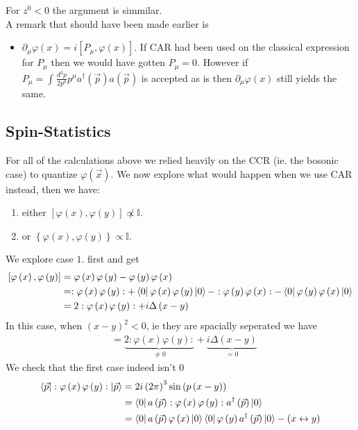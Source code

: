 \documentclass{report}
\begin{document}
For $z^{0} <0$ the argument is simmilar.\\
A remark that should have been made earlier is
\begin{itemize}
  \item $\partial_\mu \varphi\left( x \right) = i \left[ P_\mu, \varphi\left( x \right)  \right]  $. If CAR had been used on the classical expression for  $P_\mu$ then we would have gotten $P_\mu = 0$. However if $P_\mu = \int_{}^{} \frac{d^3p}{2p^{0} } p^{\mu} a^\dagger\left( \vec{p} \right) a\left( \vec{p} \right) $ is accepted as is then $\partial_\mu \varphi\left( x \right) $ still yields the same.
\end{itemize}
\subsection{Spin-Statistics}
For all of the calculations above we relied heavily on the CCR (ie. the bosonic case) to quantize $\varphi\left( \vec{x} \right) $. We now explore what would happen when we use CAR instead, then we have: 
\begin{enumerate}
  \item either $\left[ \varphi\left( x \right) , \varphi\left( y \right)  \right] \not\propto \mathbb{I}$.
  \item or $\left\{ \varphi\left( x \right) , \varphi\left( y \right)  \right\} \propto \mathbb{I}$.
\end{enumerate}
We explore case $1$. first and get
\begin{align*}
  \left[ \varphi\left( x \right) , \varphi\left( y \right)  \right] &= \varphi\left( x \right) \varphi\left( y \right) - \varphi\left( y \right) \varphi\left( x \right)  \\
  &= : \varphi\left( x \right) \varphi\left( y \right) : + \bra{0} \varphi\left( x \right) \varphi\left( y \right) \ket{0} - :\varphi\left( y \right) \varphi\left( x \right) : - \bra{0} \varphi\left( y \right) \varphi\left( x \right) \ket{0}   \\
  &= 2 :\varphi\left( x \right) \varphi\left( y \right) : + i \Delta\left( x-y \right)
\end{align*}
In this case, when $\left( x-y \right) ^2 < 0$, ie they are spacially seperated we have
\begin{align*}
  &= \underbrace{2 :\varphi\left( x \right) \varphi\left( y \right) :}_{\neq 0}  + \underbrace{ i \Delta\left( x-y \right)}_{=0} 
\end{align*}
We check that the first case indeed isn't $0$ 
\begin{align*}
  \bra{\vec{p}} :\varphi\left( x \right) \varphi\left( y \right) : \ket{\vec{p}} &= 2 i \left( 2 \pi \right) ^3 \sin\left( p\left( x-y \right)  \right)  \\
  &= \bra{0} a\left( \vec{p} \right) :\varphi\left( x \right) \varphi\left( y \right) : a^\dagger\left( \vec{p} \right) \ket{0}  \\
  &= \bra{0} a\left( \vec{p} \right) \varphi\left( x \right) \ket{0} \bra{0} \varphi\left( y \right) a^\dagger\left( \vec{p} \right) \ket{0} - \left( x \leftrightarrow y \right) 
\end{align*}
\end{document}
